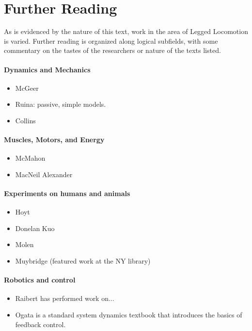 \chapter{Further Reading}
\label{sec:FurtherReading}

As is evidenced by the nature of this text, work in the area of Legged Locomotion is varied. Further reading is organized along logical subfields, with some commentary on the tastes of the researchers or nature of the texts listed.

\subsubsection*{Dynamics and Mechanics}
\begin{itemize}
\item McGeer
\item Ruina: passive, simple models.
\item Collins
\end{itemize}

\subsubsection*{Muscles, Motors, and Energy}
\begin{itemize}
\item McMahon \cite{mcmahon84}
\item MacNeil Alexander
\end{itemize}

\subsubsection*{Experiments on humans and animals}
\begin{itemize}
\item Hoyt \cite{hoyt81}
\item Donelan Kuo \cite{donelan01}
\item Molen \cite{molen72b}
\item Muybridge (featured work at the NY library)
\end{itemize}

\subsubsection*{Robotics and control}
\begin{itemize}
\item Raibert has performed work on...
\item Ogata \cite{ogata04} is a standard system dynamics textbook that introduces the basics of feedback control.
\end{itemize}

